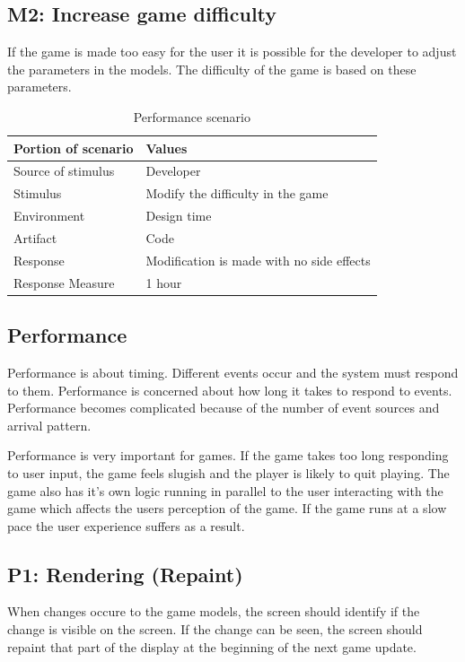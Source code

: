\subsection* {M2: Increase game difficulty}
If the game is made too easy for the user it is possible for the developer to adjust the
parameters in the models. The difficulty of the game is based on these parameters.

\begin{table}[H]
\begin{tabular}{| l | l |}
	\hline
	\rowcolor{gray}
	{\bf Portion of scenario} & {\bf Values} \\ \hline
	Source of stimulus & Developer\\ \hline
	Stimulus & Modify the difficulty in the game\\ \hline
	Environment & Design time \\ \hline
	Artifact & Code \\ \hline
	Response & Modification is made with no side effects\\ \hline
	Response Measure & 1 hour\\ \hline
\end{tabular}
\caption{Performance scenario}
\end{table}

\subsection{Performance}

Performance\cite{attributes} is about timing. Different events occur and the system must respond to them. Performance is concerned about how long it takes to respond to events. Performance becomes complicated because of the number of event sources and arrival pattern.

Performance is very important for games. If the game takes too long responding to user input, the game feels slugish and the player is likely to quit playing. The game also has it's own logic running in parallel to the user interacting with the game which affects the users perception of the game. If the game runs at a slow pace the user experience suffers as a result.

\subsection*{P1: Rendering (Repaint)}
When changes occure to the game models, the screen should identify if the change 
is visible on the screen. If the change can be seen, the screen should repaint 
that part of the display at the beginning of the next game update.

